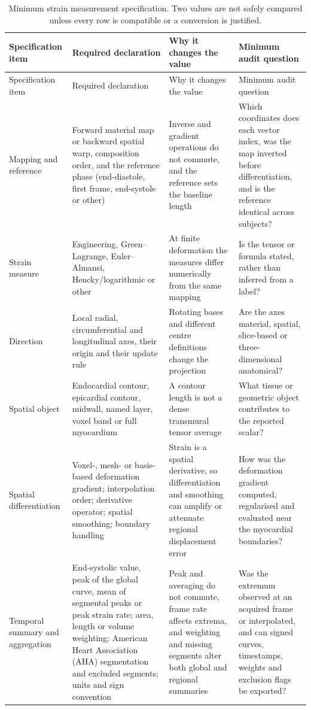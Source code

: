 \begin{longtable}{@{}L{0.17\textwidth}L{0.26\textwidth}L{0.24\textwidth}L{0.24\textwidth}@{}}
\caption{Minimum strain measurement specification. Two values are not safely compared unless every
row is compatible or a conversion is justified.}\label{tab:estimand}\\
\toprule
Specification item & Required declaration & Why it changes the value & Minimum audit question\\
\midrule
\endfirsthead
\toprule
Specification item & Required declaration & Why it changes the value & Minimum audit question\\
\midrule
\endhead
Mapping and reference & Forward material map or backward spatial warp, composition order, and the reference phase (end-diastole, first frame, end-systole or other) & Inverse and gradient operations do not commute, and the reference sets the baseline length & Which coordinates does each vector index, was the map inverted before differentiation, and is the reference identical across subjects?\\
Strain measure & Engineering, Green--Lagrange, Euler--Almansi, Hencky/logarithmic or other & At finite deformation the measures differ numerically from the same mapping & Is the tensor or formula stated, rather than inferred from a label?\\
Direction & Local radial, circumferential and longitudinal axes, their origin and their update rule & Rotating bases and different centre definitions change the projection & Are the axes material, spatial, slice-based or three-dimensional anatomical?\\
Spatial object & Endocardial contour, epicardial contour, midwall, named layer, voxel band or full myocardium & A contour length is not a dense transmural tensor average & What tissue or geometric object contributes to the reported scalar?\\
Spatial differentiation & Voxel-, mesh- or basis-based deformation gradient; interpolation order; derivative operator; spatial smoothing; boundary handling & Strain is a spatial derivative, so differentiation and smoothing can amplify or attenuate regional displacement error & How was the deformation gradient computed, regularised and evaluated near the myocardial boundaries?\\
Temporal summary and aggregation & End-systolic value, peak of the global curve, mean of segmental peaks or peak strain rate; area, length or volume weighting; American Heart Association (AHA) segmentation and excluded segments; units and sign convention & Peak and averaging do not commute, frame rate affects extrema, and weighting and missing segments alter both global and regional summaries & Was the extremum observed at an acquired frame or interpolated, and can signed curves, timestamps, weights and exclusion flags be exported?\\
\bottomrule
\end{longtable}

